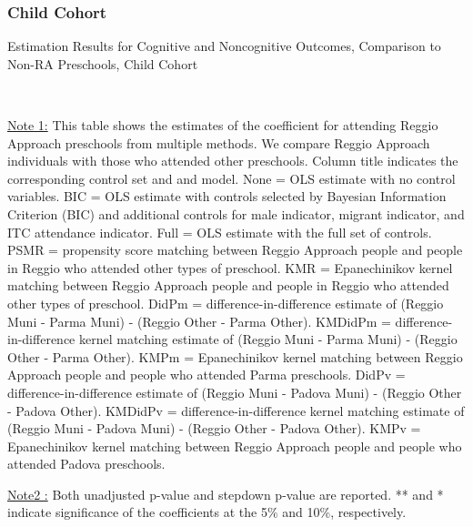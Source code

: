\subsubsection{Child Cohort}

\begin{table}[H] \caption{Estimation Results for Cognitive and Noncognitive Outcomes, Comparison to Non-RA Preschools, Child Cohort} \label{combined_child_CN_Other}
\scalebox{0.59}{}
\vspace{1ex} \\
\footnotesize\raggedright{\underline{Note 1:} This table shows the estimates of the coefficient for attending Reggio Approach preschools from multiple methods. We compare Reggio Approach individuals with those who attended other preschools. Column title indicates the corresponding control set and and model. None = OLS estimate with no control variables. BIC = OLS estimate with controls selected by Bayesian Information Criterion (BIC) and additional controls for male indicator, migrant indicator, and ITC attendance indicator. Full = OLS estimate with the full set of controls. PSMR =  propensity score matching between Reggio Approach people and people in Reggio who attended other types of preschool. KMR = Epanechinikov kernel matching between Reggio Approach people and people in Reggio who attended other types of preschool. DidPm = difference-in-difference estimate of (Reggio Muni - Parma Muni) - (Reggio Other - Parma Other). KMDidPm = difference-in-difference kernel matching estimate of (Reggio Muni - Parma Muni) - (Reggio Other - Parma Other).   KMPm = Epanechinikov kernel matching between Reggio Approach people and people who attended Parma preschools. DidPv = difference-in-difference estimate of (Reggio Muni - Padova Muni) - (Reggio Other - Padova Other). KMDidPv = difference-in-difference kernel matching estimate of (Reggio Muni - Padova Muni) - (Reggio Other - Padova Other).  KMPv = Epanechinikov kernel matching between Reggio Approach people and people who attended Padova preschools.}

\footnotesize\raggedright{\underline{Note2 :} Both unadjusted p-value and stepdown p-value are reported. ** and * indicate significance of the coefficients at the 5\% and 10\%, respectively.}
\end{table}


